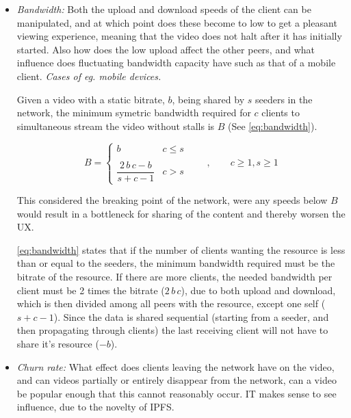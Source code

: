 \begin{itemize}
    \item \textit{Bandwidth:}
    Both the upload and download speeds of the client can be manipulated, and at which point does these become to low to get a pleasant viewing experience, meaning that the video does not halt after it has initially started. Also how does the low upload affect the other peers, and what influence does fluctuating bandwidth capacity have such as that of a mobile client. \textit{Cases of eg. mobile devices.}
    
    Given a video with a static bitrate, $b$, being shared by $s$ seeders in the network, the minimum symetric bandwidth required for $c$ clients to simultaneous stream the video without stalls is $B$ (See \autoref{eq:bandwidth}).
    
    \begin{equation} \label{eq:bandwidth}
        B = 
        \begin{cases}
            b   &   c \leq s
        \\ \\
            \dfrac{2 \, b \, c - b}{s + c - 1}  &  c > s
        \end{cases}
        \qquad , \qquad 
        c \geq 1 ,
        s \geq 1 
    \end{equation}
    
    This considered the breaking point of the network, were any speeds below $B$ would result in a bottleneck for sharing of the content and thereby worsen the \ac{UX}.
    
    \autoref{eq:bandwidth} states that if the number of clients wanting the resource is less than or equal to the seeders, the minimum bandwidth required must be the bitrate of the resource. 
    If there are more clients, the needed bandwidth per client must be 2 times the bitrate ($2 \, b \, c$), due to both upload and download, which is then divided among all peers with the resource, except one self ($s+c-1$).
    Since the data is shared sequential (starting from a seeder, and then propagating through clients) the last receiving client will not have to share it's resource ($-b$). 
    
    \item \textit{Churn rate:}
    What effect does clients leaving the network have on the video, and can videos partially or entirely disappear from the network, can a video be popular enough that this cannot reasonably occur. IT makes sense to see influence, due to the novelty of IPFS.
   

\end{itemize}
